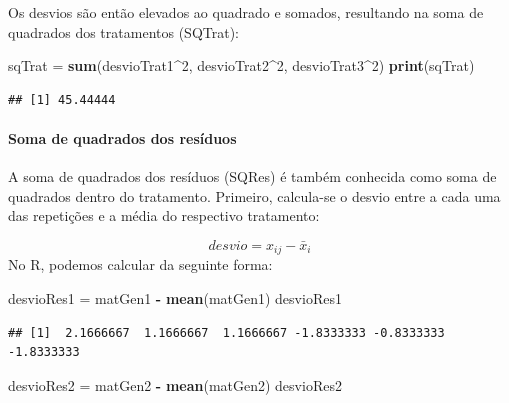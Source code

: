 \documentclass[
]{article}
\newenvironment{Shaded}{\begin{snugshade}}{\end{snugshade}}
\newcommand{\DecValTok}[1]{\textcolor[rgb]{0.00,0.00,0.81}{#1}}
\newcommand{\KeywordTok}[1]{\textcolor[rgb]{0.13,0.29,0.53}{\textbf{#1}}}
\newcommand{\NormalTok}[1]{#1}
\newcommand{\OperatorTok}[1]{\textcolor[rgb]{0.81,0.36,0.00}{\textbf{#1}}}
\newcommand{\StringTok}[1]{\textcolor[rgb]{0.31,0.60,0.02}{#1}}
\begin{document}
Os desvios são então elevados ao quadrado e somados, resultando na soma de quadrados dos tratamentos (SQTrat):

\begin{Shaded}
\begin{Highlighting}[]
\NormalTok{sqTrat =}\StringTok{ }\KeywordTok{sum}\NormalTok{(desvioTrat1}\OperatorTok{^}\DecValTok{2}\NormalTok{, desvioTrat2}\OperatorTok{^}\DecValTok{2}\NormalTok{, desvioTrat3}\OperatorTok{^}\DecValTok{2}\NormalTok{)}
\KeywordTok{print}\NormalTok{(sqTrat)}
\end{Highlighting}
\end{Shaded}

\begin{verbatim}
## [1] 45.44444
\end{verbatim}

\hypertarget{soma-de-quadrados-dos-resuxedduos}{%
\paragraph{Soma de quadrados dos resíduos}\label{soma-de-quadrados-dos-resuxedduos}}

A soma de quadrados dos resíduos (SQRes) é também conhecida como soma de quadrados dentro do tratamento. Primeiro, calcula-se o desvio entre a cada uma das repetições e a média do respectivo tratamento:

\[desvio = x_{ij} - \bar{x}_{i}\]
No R, podemos calcular da seguinte forma:

\begin{Shaded}
\begin{Highlighting}[]
\NormalTok{desvioRes1 =}\StringTok{ }\NormalTok{matGen1 }\OperatorTok{-}\StringTok{ }\KeywordTok{mean}\NormalTok{(matGen1)}
\NormalTok{desvioRes1}
\end{Highlighting}
\end{Shaded}

\begin{verbatim}
## [1]  2.1666667  1.1666667  1.1666667 -1.8333333 -0.8333333 -1.8333333
\end{verbatim}

\begin{Shaded}
\begin{Highlighting}[]
\NormalTok{desvioRes2 =}\StringTok{ }\NormalTok{matGen2 }\OperatorTok{-}\StringTok{ }\KeywordTok{mean}\NormalTok{(matGen2)}
\NormalTok{desvioRes2}
\end{Highlighting}
\end{Shaded}
\end{document}

